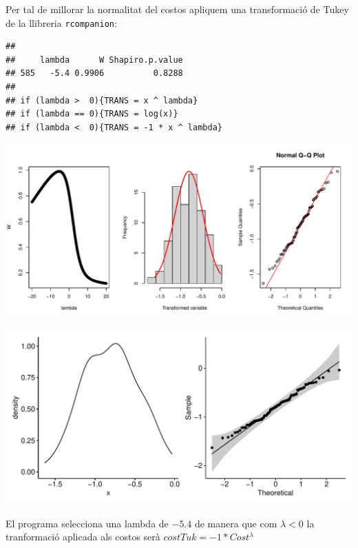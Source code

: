 \documentclass[11pt,a4paper]{article}\usepackage[]{graphicx}\usepackage[]{color}
\makeatletter
\def\maxwidth{ %
  \ifdim\Gin@nat@width>\linewidth
    \linewidth
  \else
    \Gin@nat@width
  \fi
}
\newenvironment{kframe}{%
 \def\at@end@of@kframe{}%
 \ifinner\ifhmode%
  \def\at@end@of@kframe{\end{minipage}}%
  \begin{minipage}{\columnwidth}%
 \fi\fi%
 \def\FrameCommand##1{\hskip\@totalleftmargin \hskip-\fboxsep
 \colorbox{shadecolor}{##1}\hskip-\fboxsep
     \hskip-\linewidth \hskip-\@totalleftmargin \hskip\columnwidth}%
 \MakeFramed {\advance\hsize-\width
   \@totalleftmargin\z@ \linewidth\hsize
   \@setminipage}}%
 {\par\unskip\endMakeFramed%
 \at@end@of@kframe}
\newenvironment{knitrout}{}{} %
\makeatother
\begin{document}
Per tal de millorar la normalitat del costos apliquem una transformació de Tukey de la llibreria \texttt{rcompanion}:
\begin{knitrout}
\color{fgcolor}\begin{kframe}
\begin{verbatim}
## 
##     lambda      W Shapiro.p.value
## 585   -5.4 0.9906          0.8288
## 
## if (lambda >  0){TRANS = x ^ lambda} 
## if (lambda == 0){TRANS = log(x)} 
## if (lambda <  0){TRANS = -1 * x ^ lambda}
\end{verbatim}
\end{kframe}
\includegraphics[width=\maxwidth]{figure/unnamed-chunk-19-1} 

\includegraphics[width=\maxwidth]{figure/unnamed-chunk-19-2} 

\end{knitrout}

El programa selecciona una lambda de $-5.4$ de manera que com $\lambda < 0$ la tranformació aplicada als costos serà $costTuk = -1 * Cost^{\lambda}$
\end{document}

